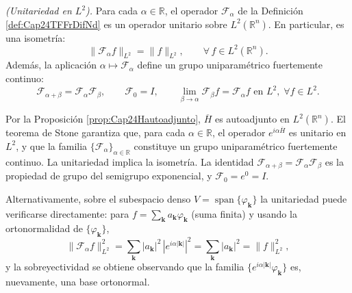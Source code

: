             \begin{proposition}\label{prop:Cap24UnitariedadDif}
                \textit{(Unitariedad en $L^2$).} Para cada $\alpha \in \mathbb{R}$, el operador $\mathcal{F}_\alpha$ de la Definición \ref{def:Cap24TFFrDifNd} es un operador unitario sobre $L^2(\mathbb{R}^n)$. En particular, es una isometría:
                \begin{equation*}
                    \|\mathcal{F}_\alpha f\|_{L^2} = \|f\|_{L^2}, \qquad \forall\, f\in L^2(\mathbb{R}^n).
                \end{equation*}
                Además, la aplicación $\alpha \mapsto \mathcal{F}_\alpha$ define un grupo uniparamétrico fuertemente continuo:
                \begin{equation}\label{eq:Cap24GrupoUniparam}
                    \mathcal{F}_{\alpha+\beta} = \mathcal{F}_\alpha \mathcal{F}_\beta,\qquad \mathcal{F}_0 = I,\qquad \lim_{\beta\to\alpha} \mathcal{F}_\beta f = \mathcal{F}_\alpha f \text{ en } L^2,\; \forall f\in L^2.
                \end{equation}
            \end{proposition}
            \begin{Proof}
                Por la Proposición \ref{prop:Cap24Hautoadjunto}, $\overline{H}$ es autoadjunto en $L^2(\mathbb{R}^n)$. El teorema de Stone \citep[Thm. VIII.7]{reed1980methods} garantiza que, para cada $\alpha \in \mathbb{R}$, el operador $e^{i\alpha \overline{H}}$ es unitario en $L^2$, y que la familia $\{\mathcal{F}_\alpha\}_{\alpha\in\mathbb{R}}$ constituye un grupo uniparamétrico fuertemente continuo. La unitariedad implica la isometría. La identidad $\mathcal{F}_{\alpha+\beta}=\mathcal{F}_\alpha \mathcal{F}_\beta$ es la propiedad de grupo del semigrupo exponencial, y $\mathcal{F}_0 = e^0 = I$.

                Alternativamente, sobre el subespacio denso $V = \operatorname{span}\{\varphi_{\boldsymbol{k}}\}$ la unitariedad puede verificarse directamente: para $f = \sum_{\boldsymbol{k}} a_{\boldsymbol{k}}\varphi_{\boldsymbol{k}}$ (suma finita) y usando la ortonormalidad de $\{\varphi_{\boldsymbol{k}}\}$,
                \begin{equation*}
                    \|\mathcal{F}_\alpha f\|_{L^2}^2 = \sum_{\boldsymbol{k}} |a_{\boldsymbol{k}}|^2\,|e^{i\alpha |\boldsymbol{k}|}|^2 = \sum_{\boldsymbol{k}}|a_{\boldsymbol{k}}|^2 = \|f\|_{L^2}^2,
                \end{equation*}
                y la sobreyectividad se obtiene observando que la familia $\{e^{i\alpha|\boldsymbol{k}|}\varphi_{\boldsymbol{k}}\}$ es, nuevamente, una base ortonormal.
            \end{Proof}


